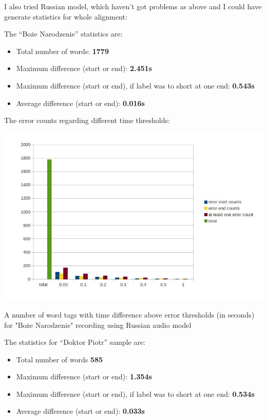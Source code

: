 \documentclass[12pt,a4paper,english]{article}
\begin{document}
\newpage

I also tried Russian model, which haven't got problems as above and I could have generate statistics for whole alignment: \newline

The “Boże Narodzenie” statistics are:
\begin{itemize}
    \item Total number of words:				\textbf{1779}
    \item Maximum difference (start or end): 			\textbf{2.451s}
    \item Maximum difference (start or end), if label was to short at one end: 			\textbf{0.543s}
    \item Average difference  (start or end):			\textbf{0.016s}
\end{itemize}
The error counts regarding different time thresholds:
\begin{center}
    \includegraphics[scale=0.7]{boze_narodzenie_word_russian_results.jpg}
    \caption[]{A number of word tags with time difference above error thresholds (in seconds) for "Boże Narodzenie" recording using Russian audio model}
\end{center}

\newpage

The statistics for “Doktor Piotr” sample are:
\begin{itemize}
    \item Total number of words				\textbf{585}
    \item Maximum difference (start or end): 			\textbf{1.354s}
    \item Maximum difference (start or end), if label was to short at one end: 			\textbf{0.534s}
    \item Average difference  (start or end):			\textbf{0.033s}
\end{itemize}
\end{document}
